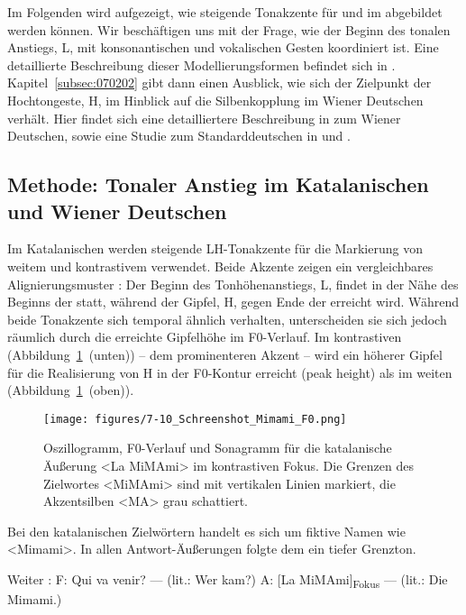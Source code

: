 Im Folgenden wird aufgezeigt, wie steigende Tonakzente für  und  im  abgebildet werden können. Wir beschäftigen uns mit der Frage, wie der Beginn des tonalen Anstiegs, L, mit konsonantischen und vokalischen Gesten koordiniert ist. Eine detaillierte Beschreibung dieser Modellierungsformen befindet sich in \citet{Mücke2012}. Kapitel~\ref{subsec:070202} gibt dann einen Ausblick, wie sich der Zielpunkt der Hochtongeste, H, im Hinblick auf die Silbenkopplung im Wiener Deutschen verhält. Hier findet sich eine detailliertere Beschreibung in \citet{Mücke2008b} zum Wiener Deutschen, sowie eine Studie zum Standarddeutschen in \citet{Niemann2015} und \citet{Niemann2017}.

\subsection{Methode: Tonaler Anstieg im Katalanischen und Wiener Deutschen}
\label{subsec:070201}

Im Katalanischen werden steigende LH-Tonakzente für die Markierung von weitem und kontrastivem  verwendet. Beide Akzente zeigen ein vergleichbares Alignierungsmuster \citep{Prieto2007a}: Der Beginn des Tonhöhenanstiegs, L, findet in der Nähe des Beginns der  statt, während der Gipfel, H, gegen Ende der  erreicht wird. Während beide Tonakzente sich temporal ähnlich verhalten, unterscheiden sie sich jedoch räumlich durch die erreichte Gipfelhöhe im F0-Verlauf. Im kontrastiven  (Abbildung~\ref{figure:0710}~(unten)) -- dem prominenteren Akzent -- wird ein höherer Gipfel für die Realisierung von H in der F0-Kontur erreicht (peak height) als im weiten  (Abbildung~\ref{figure:0710}~(oben)).

\begin{figure}
	\texttt{[image: figures/7-10\_Schreenshot\_Mimami\_F0.png]}
	\caption{Oszillogramm, F0-Verlauf und Sonagramm für die katalanische Äußerung <La MiMAmi> im kontrastiven Fokus. Die Grenzen des Zielwortes <MiMAmi> sind mit vertikalen Linien markiert, die Akzentsilben <MA> grau schattiert.}
	\label{figure:0710}
\end{figure}

Bei den katalanischen Zielwörtern handelt es sich um fiktive Namen wie <Mimami>. In allen Antwort-Äußerungen folgte dem  ein tiefer Grenzton.

\begin{exe}
	\ex Weiter :\label{ex:0711}
	\sn F: Qui va venir? --- (lit.: Wer kam?)
	\sn A: [La MiMAmi]\textsubscript{Fokus} --- (lit.: Die Mimami.)
\end{exe}

